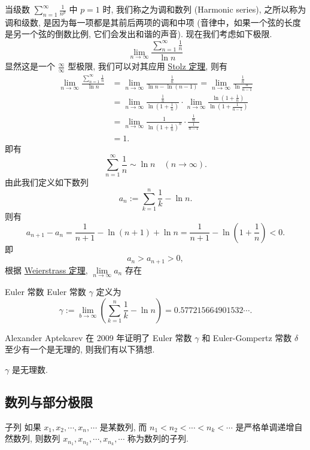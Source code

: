 \documentclass[cn,toc=twocol]{elegantbook}
\begin{document}
当级数 $\sum\limits_{n = 1}^{\infty} \frac{1}{n^p}$ 中 $p = 1$ 时, 我们称之为调和数列 (Harmonic series), 之所以称为调和级数, 是因为每一项都是其前后两项的调和中项 (音律中，如果一个弦的长度是另一个弦的倒数比例, 它们会发出和谐的声音). 现在我们考虑如下极限.
\[
	\lim_{n\to\infty} \frac{\sum\limits_{n = 1}^{\infty} \frac{1}{n}}{\ln n}
\]
显然这是一个 $\frac{\infty}{\infty}$ 型极限, 我们可以对其应用 \hyperref[thm:stolz_1]{Stolz 定理}, 则有
\[
	\begin{aligned}
		\lim_{n\to\infty} \frac{\sum\limits_{n = 1}^{\infty} \frac{1}{n}}{\ln n} &= \lim_{n\to\infty} \frac{\frac{1}{n}}{\ln n - \ln (n - 1)} = \lim_{n\to\infty} \frac{\frac{1}{n}}{\ln \frac{n}{n - 1}} \\
		&= \lim_{n\to\infty} \frac{\frac{1}{n}}{\ln \left(1 + \frac{1}{n}\right)} \cdot \lim_{n\to\infty} \frac{\ln \left(1 + \frac{1}{n}\right)}{\ln \left(1+\frac{1}{n - 1}\right)}\\
		&= \lim_{n\to\infty} \frac{1}{\ln \left(1 + \frac{1}{n}\right)^n} \cdot \frac{\frac{1}{n}}{\frac{1}{n - 1}}\\
		&= 1.
	\end{aligned}
\]
即有
\[
	\sum_{n = 1}^{\infty}\frac{1}{n} \sim \ln n \quad (n \to \infty).
\]
由此我们定义如下数列
\[
	a_n := \sum_{k = 1}^{n}\frac{1}{k} - \ln n.
\]
则有
\[
	a_{n+1} - a_n = \frac{1}{n+1} - \ln (n+1) + \ln n = \frac{1}{n+1} - \ln \left(1+\frac1n\right) < 0.
\]
即
\[
	a_n > a_{n+1} > 0,
\]
根据 \hyperref[thm:R6]{Weierstrass 定理}, $\lim\limits_{n\to\infty}a_n$ 存在

\begin{definition}{Euler 常数}
	Euler 常数 $\gamma$ 定义为
	\[
		\gamma := \lim_{b\to\infty}\left(\sum_{k=1}^n\frac{1}{k} − \ln n \right) = 0.577215664901532\cdots.
	\]
\end{definition}

Alexander Aptekarev 在 2009 年证明了 Euler 常数 $\gamma$ 和 Euler-Gompertz 常数 $\delta$ 至少有一个是无理的, 则我们有以下猜想.

\begin{conjecture}
$\gamma$ 是无理数.	
\end{conjecture}



\subsection{数列与部分极限}
\begin{definition}{子列}
如果 $x_1, x_2, \cdots, x_n, \cdots$ 是某数列, 而 $n_1 < n_2 < \cdots < n_k < \cdots$ 是严格单调递增自然数列, 则数列 $x_{n_1}, x_{n_2}, \cdots, x_{n_k}, \cdots$ 称为数列的子列.
\end{definition}
\end{document}
